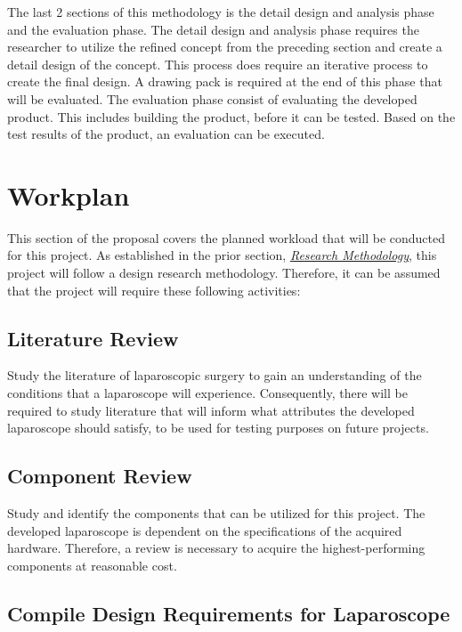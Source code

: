 \vspace{0.5cm}
\noindent
The last 2 sections of this methodology is the detail design and analysis phase and the evaluation phase. The detail design and analysis phase requires the researcher to utilize the refined concept from the preceding section and create a detail design of the concept. This process does require an iterative process to create the final design. A drawing pack is required at the end of this phase that will be evaluated. The evaluation phase consist of evaluating the developed product. This includes building the product, before it can be tested. Based on the test results of the product, an evaluation can be executed.


\section{Workplan}

This section of the proposal covers the planned workload that will be conducted for this project. As established in the prior section, \textit{\hyperref[sec:Research Methodology]{Research Methodology}}, this project will follow a design research methodology. Therefore, it can be assumed that the project will require these following activities:

\subsection{Literature Review}

Study the literature of laparoscopic surgery to gain an understanding of the conditions that a laparoscope will experience. Consequently, there will be required to study literature that will inform what attributes the developed laparoscope should satisfy, to be used for testing purposes on future projects.

\subsection{Component Review}

Study and identify the components that can be utilized for this project. The developed laparoscope is dependent on the specifications of the acquired hardware. Therefore, a review is necessary to acquire the highest-performing components at reasonable cost.

\subsection{Compile Design Requirements for Laparoscope}

